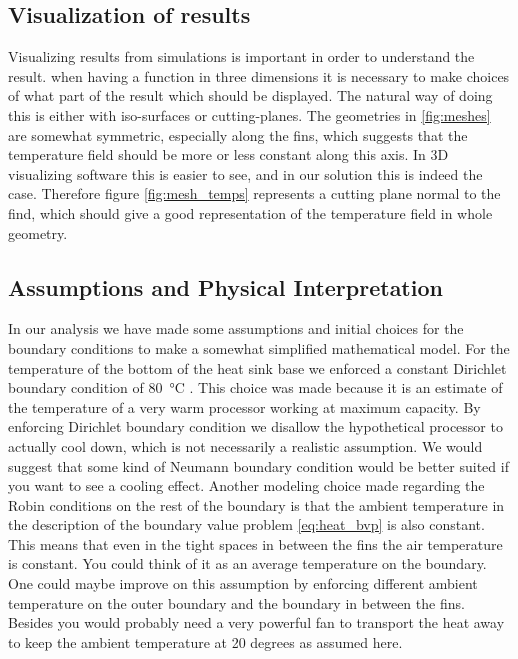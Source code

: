 \subsection{Visualization of results}
Visualizing results from simulations is important in order to understand the result. when having a function in three dimensions it is necessary to make choices of what part of the result which should be displayed. The natural way of doing this is either with iso-surfaces or cutting-planes. The geometries in \ref{fig:meshes} are somewhat symmetric, especially along the fins, which suggests that the temperature field should be more or less constant along this axis. In 3D visualizing software this is easier to see, and in our solution this is indeed the case. Therefore figure \ref{fig:mesh_temps} represents a cutting plane normal to the find, which should give a good representation of the temperature field in whole geometry.

\subsection{Assumptions and Physical Interpretation}
In our analysis we have made some assumptions and initial choices for the boundary conditions to make a somewhat simplified mathematical model. For the temperature of the bottom of the heat sink base we enforced a constant Dirichlet boundary condition of \SI{80}{\celsius} . This choice was made because it is an estimate of the temperature of a very warm processor working at maximum capacity. By enforcing Dirichlet boundary condition we disallow the hypothetical processor to actually cool down, which is not necessarily a realistic assumption. We would suggest that some kind of Neumann boundary condition would be better suited if you want to see a cooling effect. Another modeling choice made regarding the Robin conditions on the rest of the boundary is that the ambient temperature in the description of the boundary value problem \eqref{eq:heat_bvp} is also constant. This means that even in the tight spaces in between the fins the air temperature is constant. You could think of it as an average temperature on the boundary. One could maybe improve on this assumption by enforcing different ambient temperature on the outer boundary and the boundary in between the fins. Besides you would probably need a very powerful fan to transport the heat away to keep the ambient temperature at 20 degrees as assumed here. 
